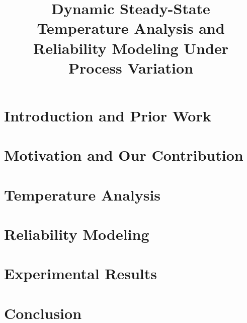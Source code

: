 \documentclass[conference]{IEEEtran}
\begin{document}
  \title{Dynamic Steady-State Temperature Analysis and Reliability Modeling Under Process Variation}

  \author{}

  \maketitle

  \begin{abstract}
    
  \end{abstract}

  \section{Introduction and Prior Work} 
  

  \section{Motivation and Our Contribution}

  \section{Temperature Analysis}

  \section{Reliability Modeling}

  \section{Experimental Results}

  \section{Conclusion} 
  

  \printbibliography
\end{document}
